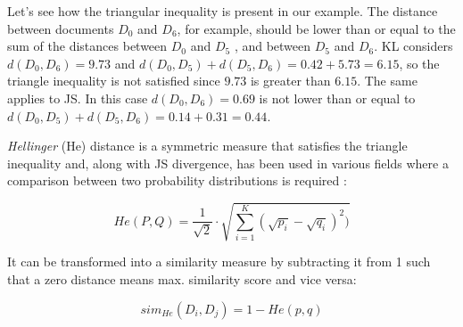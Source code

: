Let's see how the triangular inequality is present in our example. The distance between documents $D_0$ and $D_6$, for example, should be lower than or equal to the sum of the distances between $D_0$ and $D_5$ , and between $D_5$ and $D_6$. KL considers $d(D_0,D_6)=9.73$ and $d(D_0,D_5)+d(D_5,D_6)=0.42+5.73=6.15$, so the triangle inequality is not satisfied since $9.73$ is greater than $6.15$. The same applies to JS. In this case $d(D_0,D_6)=0.69$ is not lower than or equal to $d(D_0,D_5)+d(D_5,D_6)=0.14+0.31=0.44$.


\textit{Hellinger} (He) distance \citep{Basseville89,DasGupta2011} is a symmetric measure that satisfies the triangle inequality and, along with JS divergence, has been used in various fields where a comparison between two probability distributions is required \citep{Blei2007a,Hall2008,Boyd-Graber2010}:

\begin{equation}
	He(P, Q) = \frac{1}{\sqrt{2}}\cdot\sqrt{\sum\limits_{i=1}^K (\sqrt{p_i} - \sqrt{q_i})^2)}
	\label{eq:hedistance}
\end{equation}

It can be transformed into a similarity measure by subtracting it from 1 \citep{Rus2013} such that a zero distance means max. similarity score and vice versa:

\begin{equation}
	sim_{He}(D_i, D_j) = 1 - He(p,q)
	\label{eq:simhe}
\end{equation}


